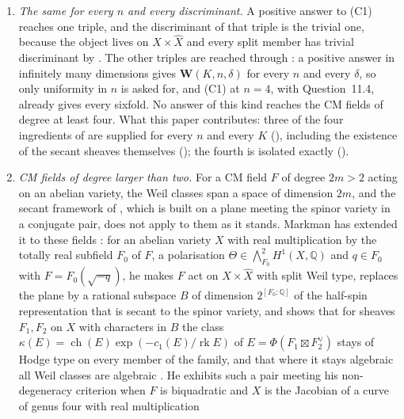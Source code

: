 \documentclass[11pt,reqno]{amsart}
\theoremstyle{plain}
\theoremstyle{definition}
\theoremstyle{remark}
\newcommand{\QQ}{\mathbb{Q}}
\DeclareMathOperator{\ch}{ch}
\DeclareMathOperator{\rk}{rk}
\begin{document}
\begin{enumerate}[label=\textup{(C\arabic*)},leftmargin=3.0em,itemsep=4pt]
  Hilbert--Burch resolution split into powers of $\Theta$ or into simple
  semi-homogeneous bundles (\cite[Theorem~4.89]{paperII}, \cite[Theorem~4.92]{paperII}), and
  no complete intersection occurs (\cite[Theorem~4.81]{paperII}).
\item \emph{The same for every $n$ and every discriminant.} A positive answer
  to (C1) reaches one triple, and the discriminant of that triple is the
  trivial one, because the object lives on $X\times\widehat X$ and every split
  member has trivial discriminant by \cite[Proposition~15.19(ii)]{paperI}. The other
  triples are reached through : a positive answer in
  infinitely many dimensions gives $\mathbf{W}(K,n,\delta)$ for every $n$ and
  every $\delta$, so only uniformity in $n$ is asked for, and (C1) at $n=4$,
  with Question~11.4, already gives every sixfold. No answer of this kind
  reaches the CM fields of degree at least four. What this paper
  contributes: three of the four ingredients of \cite[Question~13.7]{paperI} are supplied
  for every $n$ and every $K$ (\cite[Theorem~14.15]{paperI}), including the
  existence of the secant sheaves themselves (\cite[Theorem~14.13]{paperI}); the
  fourth is isolated exactly (\cite[Remark~14.16]{paperI}).
\item \emph{CM fields of degree larger than two.} For a CM field $F$ of
  degree $2m>2$ acting on an abelian variety, the Weil classes span a space of
  dimension $2m$, and the secant framework of \cite[Section~14]{paperI}, which
  is built on a plane meeting the spinor variety in a conjugate pair, does not
  apply to them as it stands. Markman has extended it to these fields
  \cite{Mar25c}: for an abelian variety $X$ with real multiplication by the
  totally real subfield $F_{0}$ of $F$, a polarisation
  $\Theta\in\bigwedge^{2}_{F_{0}}H^{1}(X,\QQ)$ and $q\in F_{0}$ with
  $F=F_{0}(\sqrt{-q})$, he makes $F$ act on $X\times\widehat{X}$ with split
  Weil type, replaces the plane by a rational subspace $B$ of dimension
  $2^{[F_{0}:\QQ]}$ of the half-spin representation that is secant to the
  spinor variety, and shows that for sheaves $F_{1},F_{2}$ on $X$ with
  characters in $B$ the class $\kappa(E)=\ch(E)\exp(-c_{1}(E)/\rk E)$ of
  $E=\Phi(F_{1}\boxtimes F_{2}^{\vee})$ stays of Hodge type on every member
  of the family, and that where it stays algebraic all Weil classes are
  algebraic \cite[Theorem~1.1.2, Proposition~10.2.1]{Mar25c}. He exhibits
  such a pair meeting his non-degeneracy criterion when $F$ is biquadratic
  and $X$ is the Jacobian of a curve of genus four with real multiplication

\end{enumerate}
\end{document}

